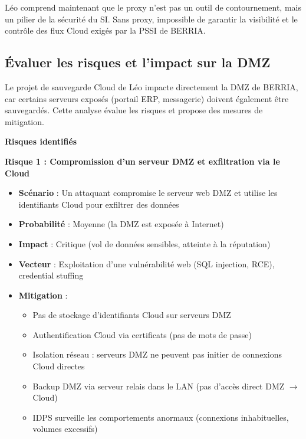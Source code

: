 \medskip

\noindent Léo comprend maintenant que le proxy n'est pas un outil de contournement, mais un pilier de la sécurité du SI. Sans proxy, impossible de garantir la visibilité et le contrôle des flux Cloud exigés par la PSSI de BERRIA.

\newpage

\subsection*{Évaluer les risques et l'impact sur la DMZ}
{}

Le projet de sauvegarde Cloud de Léo impacte directement la DMZ de BERRIA, car certains serveurs exposés (portail ERP, messagerie) doivent également être sauvegardés. Cette analyse évalue les risques et propose des mesures de mitigation.

\medskip

\noindent \textbf{Risques identifiés}

\medskip

\noindent \textbf{Risque 1 : Compromission d'un serveur DMZ et exfiltration via le Cloud}
\begin{itemize}
  \item \textbf{Scénario} : Un attaquant compromise le serveur web DMZ et utilise les identifiants Cloud pour exfiltrer des données
  \item \textbf{Probabilité} : Moyenne (la DMZ est exposée à Internet)
  \item \textbf{Impact} : Critique (vol de données sensibles, atteinte à la réputation)
  \item \textbf{Vecteur} : Exploitation d'une vulnérabilité web (SQL injection, RCE), credential stuffing
  \item \textbf{Mitigation} :
  \begin{itemize}
    \item Pas de stockage d'identifiants Cloud sur serveurs DMZ
    \item Authentification Cloud via certificats (pas de mots de passe)
    \item Isolation réseau : serveurs DMZ ne peuvent pas initier de connexions Cloud directes
    \item Backup DMZ via serveur relais dans le LAN (pas d'accès direct DMZ $\rightarrow$ Cloud)
    \item IDPS surveille les comportements anormaux (connexions inhabituelles, volumes excessifs)
  \end{itemize}
\end{itemize}

